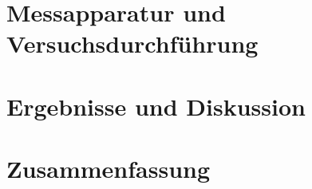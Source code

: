 \documentclass[a4paper,twoside,final]{article}
\begin{document}
\section{Messapparatur und Versuchsdurchführung} \label{sec:Versuchsdurchführung}
\newpage
\section{Ergebnisse und Diskussion}\label{sec:ErgebnisseUndDiskussion}

\section{Zusammenfassung}

\begin{thebibliography}{xxx}
\end{thebibliography}
\end{document}
